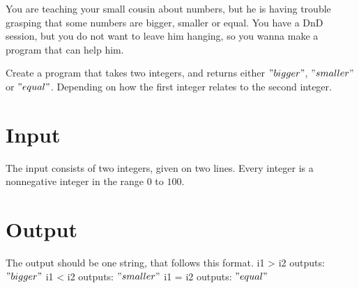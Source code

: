 
You are teaching your small cousin about numbers, but he is having trouble grasping that some numbers are bigger, smaller or equal.
You have a DnD session, but you do not want to leave him hanging, so you wanna make a program that can help him. 

Create a program that takes two integers, and returns either $"bigger"$, $"smaller"$ or $"equal"$. Depending on how the first integer relates to the second integer.

\section*{Input}

The input consists of two integers, given on two lines.
Every integer is a nonnegative integer in the range $0$ to $100$.

\section*{Output}

The output should be one string, that follows this format.
i1 > i2 outputs: $"bigger"$
i1 < i2 outputs: $"smaller"$ 
i1 = i2 outputs: $"equal"$